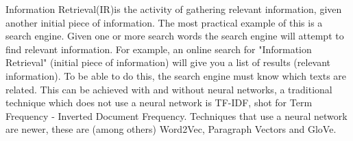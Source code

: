 \documentclass[../../Thesis.tex]{subfiles}
\begin{document}
Information Retrieval(IR)is the activity of gathering relevant information, given another initial piece of information. The most practical example of this is a search engine. Given one or more search words the search engine will attempt to find relevant information. For example, an online search for "Information Retrieval" (initial piece of information) will give you a list of results (relevant information). To be able to do this, the search engine must know which texts are related. This can be achieved with and without neural networks, a traditional technique which does not use a neural network is TF-IDF, shot for Term Frequency - Inverted Document Frequency. Techniques that use a neural network are newer, these are (among others) Word2Vec, Paragraph Vectors and GloVe.
\end{document}
